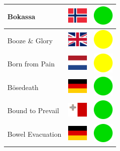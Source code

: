 \documentclass[12pt, a4paper, twoside]{report}
\begin{document}
\begin{center}
\begin{longtable}{|p{5cm}|p{2cm}|p{2cm}|}
Bokassa & \includegraphics[width=1cm]{4x3/no} & \includegraphics[width=1cm]{likes/y} \\ \hline
Booze \& Glory & \includegraphics[width=1cm]{4x3/gb} & \includegraphics[width=1cm]{likes/m} \\ \hline
Born from Pain & \includegraphics[width=1cm]{4x3/nl} & \includegraphics[width=1cm]{likes/m} \\ \hline
Bösedeath & \includegraphics[width=1cm]{4x3/de} & \includegraphics[width=1cm]{likes/y} \\ \hline
Bound to Prevail & \includegraphics[width=1cm]{4x3/mt} & \includegraphics[width=1cm]{likes/y} \\ \hline
Bowel Evacuation & \includegraphics[width=1cm]{4x3/de} & \includegraphics[width=1cm]{likes/y} \\ \hline

\end{longtable}
\end{center}
\end{document}
